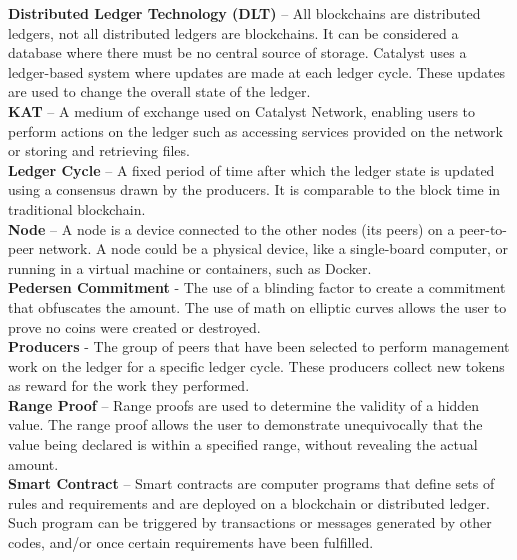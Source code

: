 \textbf{Distributed Ledger Technology (DLT)} – All blockchains are distributed ledgers, not all distributed ledgers are blockchains. It can be considered a database where there must be no central source of storage. Catalyst uses a ledger-based system where updates are made at each ledger cycle. These updates are used to change the overall state of the ledger. \\

\textbf{KAT} – A medium of exchange used on Catalyst Network, enabling users to perform actions on the ledger such as accessing services provided on the network or storing and retrieving files. \\

\textbf{Ledger Cycle} – A fixed period of time after which the ledger state is updated using a consensus drawn by the producers. It is comparable to the block time in traditional blockchain. \\

\textbf{Node} – A node is a device connected to the other nodes (its peers) on a peer-to-peer network. A node could be a physical device, like a single-board computer, or running in a virtual machine or containers, such as Docker. \\

\textbf{Pedersen Commitment} - The use of a blinding factor to create a commitment that obfuscates the amount. The use of math on elliptic curves allows the user to prove no coins were created or destroyed. \\

\textbf{Producers} - The group of peers that have been selected to perform management work on the ledger for a specific ledger cycle. These producers collect new tokens as reward for the work they performed. \\

\textbf{Range Proof} – Range proofs are used to determine the validity of a hidden value. The range proof allows the user to demonstrate unequivocally that the value being declared is within a specified range, without revealing the actual amount. \\

\textbf{Smart Contract} – Smart contracts are computer programs that define sets of rules and requirements and are deployed on a blockchain or distributed ledger. Such program can be triggered by transactions or messages generated by other codes, and/or once certain requirements have been fulfilled. \\

